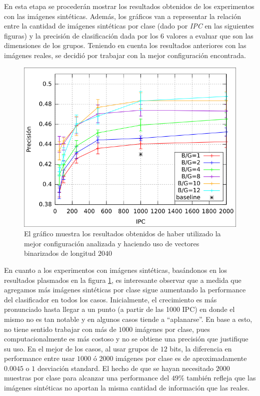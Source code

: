     En esta etapa se procederán mostrar los resultados obtenidos de los experimentos con las imágenes sintéticas. Además, los gráficos van a representar la relación entre la cantidad de imágenes sintéticas por clase (dado por \textit{IPC} en las siguientes figuras) y la precisión de clasificación dada por los $6$ valores a evaluar que son las dimensiones de los grupos. Teniendo en cuenta los resultados anteriores con las imágenes reales, se decidió por trabajar con la mejor configuración encontrada.

			\begin{figure}[htbp]
				\centering
				\centerline{
					\includegraphics[scale=0.6]{img/resultados/sinteticas/mean_2040.png}
				}
				\caption[Sintéticas media 2040]{El gráfico muestra los resultados obtenidos de haber utilizado la mejor configuración analizada y haciendo uso de vectores binarizados de longitud $2040$}
				\label{fig: Sinteticas-media-2040}
			\end{figure}

	En cuanto a los experimentos con imágenes sintéticas, basándonos en los resultados plasmados en la figura \ref{fig: Sinteticas-media-2040}, es interesante observar que a medida que agregamos más imágenes sintéticas por clase sigue aumentando la performance del clasificador en todos los casos. Inicialmente, el crecimiento es más pronunciado hasta llegar a un punto (a partir de las 1000 IPC) en donde el mismo no es tan notable y en algunos casos tiende a ``aplanarse''. En base a esto, no tiene sentido trabajar con más de $1000$ imágenes por clase, pues computacionalmente es más costoso y no se obtiene una precisión que justifique su uso. En el mejor de los casos, al usar grupos de $12$ bits, la diferencia en performance entre usar $1000$ ó $2000$ imágenes por clase es de aproximadamente $0.0045$ o $1$ desviación standard. El hecho de que se hayan necesitado $2000$ muestras por clase para alcanzar una performance del $49\%$ también refleja que las imágenes sintéticas no aportan la misma cantidad de información que las reales.

